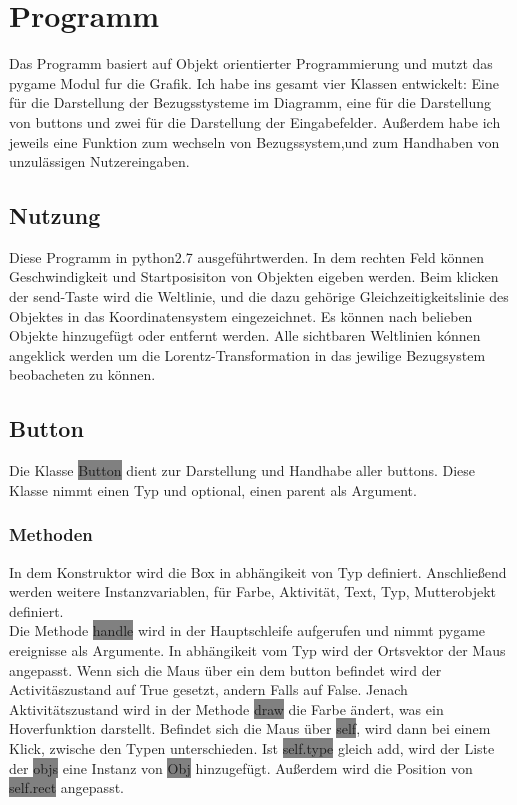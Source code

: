 \documentclass[12pt]{article}
\begin{document}
\section{Programm}
Das Programm basiert auf Objekt orientierter Programmierung und mutzt das pygame Modul fur die Grafik.
Ich habe ins gesamt vier Klassen entwickelt:
Eine für die Darstellung der Bezugsstysteme im Diagramm, eine für die Darstellung von buttons und zwei für die Darstellung der Eingabefelder.
Außerdem habe ich jeweils eine Funktion zum wechseln von Bezugssystem,und zum Handhaben von unzulässigen Nutzereingaben.
\subsection{Nutzung}
Diese Programm in python2.7 ausgeführtwerden.
In dem rechten Feld können Geschwindigkeit und Startposisiton von Objekten eigeben werden.
Beim klicken der send-Taste wird die Weltlinie, und die dazu gehörige Gleichzeitigkeitslinie des Objektes in das Koordinatensystem eingezeichnet.
Es können nach belieben Objekte hinzugefügt oder entfernt werden.
Alle sichtbaren Weltlinien kónnen angeklick werden um die Lorentz-Transformation in das jewilige Bezugsystem beobacheten zu können.
\subsection{Button}
Die Klasse \colorbox{gray}{Button} dient zur Darstellung und Handhabe aller buttons.
Diese Klasse nimmt einen Typ und optional, einen parent als Argument.
\subsubsection{Methoden}
In dem Konstruktor wird die Box in abhängikeit von Typ definiert.
Anschließend werden weitere Instanzvariablen, für Farbe, Aktivität, Text, Typ, Mutterobjekt definiert.
\\

Die Methode \colorbox{gray}{handle} wird in der Hauptschleife aufgerufen und nimmt pygame ereignisse als Argumente.
In abhängikeit vom Typ wird der Ortsvektor der Maus angepasst.
Wenn sich die Maus über ein dem button befindet wird der Activitäszustand auf True gesetzt, andern Falls auf False.
Jenach Aktivitätszustand wird in der Methode \colorbox{gray}{draw} die Farbe ändert, was ein Hoverfunktion darstellt.
Befindet sich die Maus über \colorbox{gray}{self}, wird dann bei einem Klick, zwische den Typen unterschieden.
Ist \colorbox{gray}{self.type} gleich add, wird der Liste der \colorbox{gray}{objs} eine Instanz von \colorbox{gray}{Obj} hinzugefügt.
Außerdem wird die Position von \colorbox{gray}{self.rect} angepasst.
\end{document}
